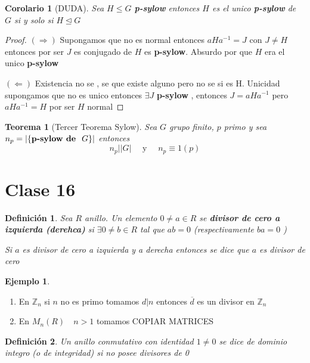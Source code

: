 \documentclass[10pt]{extarticle}
\theoremstyle{break}
\newtheorem{theorem}{Teorema}[section]
\newtheorem{corollary}{Corolario}[theorem]
\newtheorem{definition}{Definición}[section]
\theoremstyle{definition}
\newtheorem{example}{Ejemplo}[section]
\begin{document}
\begin{corollary}[DUDA]
	Sea $H\leq  G$ \textbf{p-sylow} entonces $H$ es el unico \textbf{p-sylow} de $G$ si y solo si $H\trianglelefteq G$ 
\end{corollary}
\begin{proof}
	$(\Rightarrow )$ Supongamos que no es normal entonces $aHa^{-1} = J$ con $J\neq H$ entonces por ser $J$ es conjugado de $H$ es \textbf{p-sylow}. Absurdo por que $H$ era el unico \textbf{p-sylow} 

	$(\Leftarrow)$ Existencia no se , se que existe alguno pero no se si es H. Unicidad supongamos que no es unico entonces $\exists J$ \textbf{p-sylow} , entonces $J=aHa^{-1}$ pero $aHa^{-1}=H$ por ser $H$ normal 
\end{proof}

\begin{theorem}[Tercer Teorema Sylow]
	Sea $G$ grupo finito, $p$ primo y sea $n_{p}=\lvert \{\text{\textbf{p-sylow de } } G\} \rvert $ entonces $$n_{p}\bigg| \lvert G \rvert \quad \text{ y }\quad  n_{p}\equiv 1 (p)$$   
\end{theorem}


\section{Clase 16}
\begin{definition}
	Sea $R$ anillo. Un elemento $0\neq a\in R$ se \textbf{divisor de cero a izquierda (derehca)} si $\exists 0\neq b\in R$ tal que $ab=0$ (respectivamente $ba=0$ ) 
	
	Si $a$ es divisor de cero a izquierda y a derecha entonces se dice que $a$ es divisor de cero
\end{definition}

\begin{example}
	\begin{enumerate}
		\item En $\mathbb{Z}_{n}$ si $n$ no es primo tomamos $d|n$ entonces $\overline{d}$ es un divisor en $\mathbb{Z}_{n}$
		\item En $M_{n}(R)\quad n>1$ tomamos COPIAR MATRICES   
	\end{enumerate}
\end{example}

\begin{definition}
	Un anillo conmutativo con identidad $1\neq 0$ se dice de dominio integro (o de integridad) si no posee divisores de 0
\end{definition}
\end{document}
